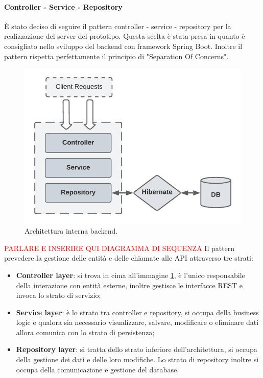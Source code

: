 \paragraph{Controller - Service - Repository}
È stato deciso di seguire il pattern controller - service - repository per la realizzazione del server del prototipo. Questa scelta è stata presa in quanto è consigliato nello sviluppo del backend con framework Spring Boot. Inoltre il pattern rispetta perfettamente il principio di "Separation Of Concerns".\\
\FloatBarrier
\begin{figure}[!h]
\centering
\includegraphics[width=0.8\linewidth]{immagini/controllerServiceRepository.pdf}
\caption{Architettura interna backend.}
\label{controller-service-repository}
\end{figure}
\textcolor{red}{PARLARE E INSERIRE QUI DIAGRAMMA DI SEQUENZA}
\FloatBarrier
Il pattern prevedere la gestione delle entità e delle chiamate alle API attraverso tre strati:
\begin{itemize}
  \item \textbf{Controller layer}: si trova in cima all'immagine \ref{controller-service-repository}, è l'unico responsabile della interazione con entità esterne, inoltre gestisce le interfacce REST e invoca lo strato di servizio;
  \item \textbf{Service layer}: è lo strato tra controller e repository, si occupa della business logic e qualora sia necessario visualizzare, salvare, modificare o eliminare dati allora comunica con lo strato di persistenza;
  \item \textbf{Repository layer}: si tratta dello strato inferiore dell'architettura, si occupa della gestione dei dati e delle loro modifiche. Lo strato di repository inoltre si occupa della comunicazione e gestione del database.
\end{itemize}
